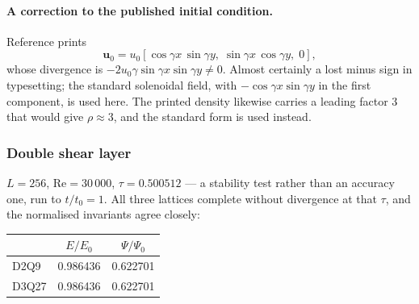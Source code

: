 \documentclass[11pt,a4paper]{article}
\newcommand{\uu}{\bm{u}}
\begin{document}
\paragraph{A correction to the published initial condition.} Reference
\cite{derosis2020} prints
\begin{equation*}
  \uu_0 = u_0[\cos\gamma x\,\sin\gamma y,\;\sin\gamma x\,\cos\gamma y,\;0],
\end{equation*}
whose divergence is $-2u_0\gamma\sin\gamma x\sin\gamma y \neq 0$. Almost certainly a lost minus
sign in typesetting; the standard solenoidal field, with $-\cos\gamma x
\sin\gamma y$ in the first component, is used here. The printed density
likewise carries a leading factor $3$ that would give $\rho\approx 3$, and the
standard form is used instead.

\subsubsection{Double shear layer}

$L=256$, $\mathrm{Re}=30\,000$, $\tau=0.500512$ --- a stability test rather than
an accuracy one, run to $t/t_0=1$. All three lattices complete without
divergence at that $\tau$, and the normalised invariants agree closely:

\begin{center}\small
\begin{tabular}{lcc}
\toprule
 & $E/E_0$ & $\Psi/\Psi_0$ \\
\midrule
D2Q9  & 0.986436 & 0.622701 \\
D3Q27 & 0.986436 & 0.622701 \\
\bottomrule
\end{tabular}
\end{center}
\end{document}
